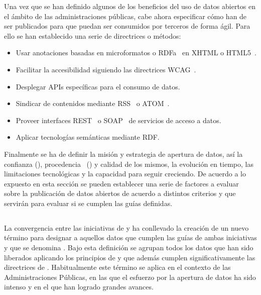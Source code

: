 Una vez que se han definido algunos de los beneficios del uso de datos abiertos en el ámbito de las
administraciones públicas, cabe ahora especificar cómo han de ser publicados para que
puedan ser consumidos por terceros de forma ágil. Para ello se han establecido una serie
de directrices o métodos:
\begin{itemize}
 \item Usar anotaciones basadas en microformatos o \gls{RDFa}~\cite{rdfa-primer} en \gls{XHTML} o \gls{HTML}5~\cite{HTML5}.
 \item Facilitar la accesibilidad siguiendo las directrices \gls{WCAG}~\cite{wcag2}.
 \item Desplegar APIs específicas para el consumo de datos.
 \item Sindicar de contenidos mediante \gls{RSS}~\cite{rss} o \gls{ATOM}~\cite{atom-rfc}.
 \item Proveer interfaces \gls{REST}~\cite{Fielding2000} o \gls{SOAP}~\cite{SOAP11} de servicios de acceso a datos.
 \item Aplicar tecnologías semánticas mediante \gls{RDF}.
\end{itemize}

Finalmente se ha de definir la misión y estrategia de apertura de datos, así la confianza (\trust), procedencia~\cite{Carroll05namedgraphs,prov-group} (\provenance) y calidad de los mismos, la
evolución en tiempo, las limitaciones tecnológicas y la capacidad para seguir creciendo. De acuerdo a lo expuesto en esta sección se pueden
establecer una serie de factores a evaluar sobre la publicación de datos abiertos de acuerdo a distintos criterios y que 
servirán para evaluar si se cumplen las guías definidas. 

\subsection{\lod}
La convergencia entre las iniciativas de \linkeddata y \opendata ha conllevado la creación
de un nuevo término para designar a aquellos datos que cumplen las guías de ambas iniciativas y que 
se denomina \lod. Bajo esta definición se agrupan todos los datos que han sido
liberados aplicando los principios de \linkeddata y que además cumplen significativamente
las directrices de \opendata. Habitualmente este término se aplica en el contexto de las Administraciones
Públicas, en las que el esfuerzo por la apertura de datos ha sido intenso y en el que han logrado grandes avances. 

